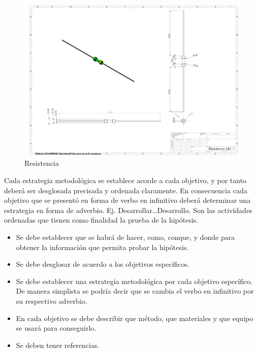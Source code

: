     \begin{figure}[H]
        \centering
        \includegraphics[trim = {10mm 10mm 10mm 10mm},clip,scale=0.120]{24/Img/Resistencia.pdf}
        \caption{Resistencia}
        \label{fig:Resistencia}
    \end{figure}
    Cada estrategia metodológica se establece acorde a cada objetivo, y por tanto deberá ser desglosada precisada y ordenada claramente. En consecuencia cada objetivo que se presentó en forma de verbo en infinitivo deberá determinar una estrategia en forma de adverbio. Ej. Desarrollar…Desarrollo. Son las actividades ordenadas que tienen como finalidad la prueba de la hipótesis. 
    
    \begin{itemize}
        \item Se debe establecer que se habrá de hacer, como, conque, y donde para obtener la información que permita probar la hipótesis.  
        \item Se debe desglosar de acuerdo a los objetivos específicos. 
        \item Se debe establecer una estrategia metodológica por cada objetivo específico. De manera simplista se podría decir que se cambia el verbo en infinitivo por su respectivo adverbio.
        \item En cada objetivo se debe describir que método, que materiales y que equipo se usará para conseguirlo.
        \item Se deben tener referencias.
    \end{itemize}
    \begin{figure} [H]
    
    \end{figure}
    
